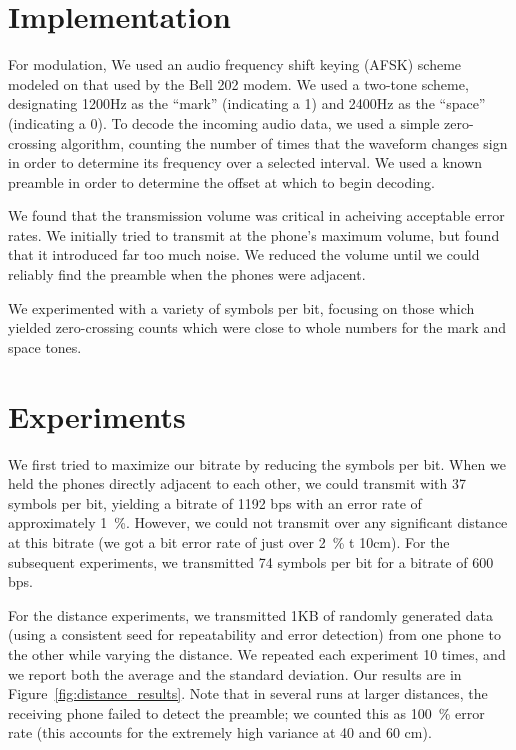\documentclass{article}
\title{\class} \author{\us}
\begin{document}
\maketitle

\section{Implementation}
For modulation, We used an audio frequency shift keying (AFSK) scheme
modeled on that used by the Bell 202 modem. We used a two-tone scheme,
designating 1200Hz as the ``mark'' (indicating a 1) and 2400Hz as the
``space'' (indicating a 0). To decode the incoming audio data, we used
a simple zero-crossing algorithm, counting the number of times that
the waveform changes sign in order to determine its frequency over a
selected interval. We used a known preamble in order to determine the
offset at which to begin decoding.

We found that the transmission volume was critical in acheiving
acceptable error rates. We initially tried to transmit at the phone's
maximum volume, but found that it introduced far too much noise. We
reduced the volume until we could reliably find the preamble when the
phones were adjacent.

We experimented with a variety of symbols per bit, focusing on those
which yielded zero-crossing counts which were close to whole numbers
for the mark and space tones.

\section{Experiments}
We first tried to maximize our bitrate by reducing the symbols per
bit. When we held the phones directly adjacent to each other, we could
transmit with 37 symbols per bit, yielding a bitrate of 1192 bps with
an error rate of approximately 1~\%. However, we could not transmit
over any significant distance at this bitrate (we got a bit error rate
of just over 2~\% t 10cm). For the subsequent experiments, we
transmitted 74 symbols per bit for a bitrate of 600 bps.

For the distance experiments, we transmitted 1KB of randomly generated
data (using a consistent seed for repeatability and error detection)
from one phone to the other while varying the distance. We repeated
each experiment 10 times, and we report both the average and the
standard deviation. Our results are in
Figure~\ref{fig:distance_results}. Note that in several runs at larger
distances, the receiving phone failed to detect the preamble; we
counted this as 100~\% error rate (this accounts for the extremely
high variance at 40 and 60 cm).
\end{document}
